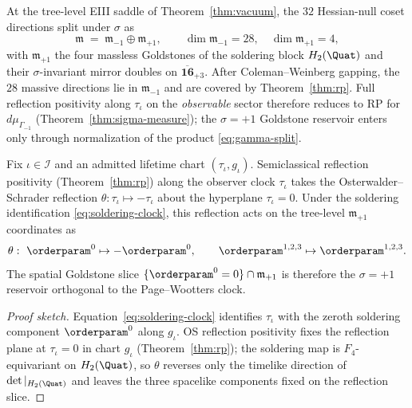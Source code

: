 \begin{lemma}
\label{lem:goldstone-sigma}
At the tree-level EIII saddle of Theorem~\ref{thm:vacuum}, the $32$
Hessian-null coset directions split under $\sigma$ as
\begin{equation}\label{eq:goldstone-split}
  \mathfrak{m}
  \;=\;
  \mathfrak{m}_{-1}\oplus\mathfrak{m}_{+1},
  \qquad
  \dim\mathfrak{m}_{-1}=28,\quad \dim\mathfrak{m}_{+1}=4,
\end{equation}
with $\mathfrak{m}_{+1}$ the four massless Goldstones of the soldering block
$H_2(\Quat)$ and their $\sigma$-invariant mirror doubles on
$\overline{\mathbf{16}}_{+3}$. After Coleman--Weinberg gapping, the
$28$ massive directions lie in $\mathfrak{m}_{-1}$ and are covered by
Theorem~\ref{thm:rp}. Full reflection positivity along $\tau_\iota$ on the
\emph{observable} sector therefore reduces to RP for $d\mu_{\Gamma_{-1}}$
(Theorem~\ref{thm:sigma-measure}); the $\sigma=+1$ Goldstone reservoir
enters only through normalization of the product \eqref{eq:gamma-split}.
\end{lemma}

\begin{proposition}
\label{prop:goldstone-rp-plane}
Fix $\iota\in\mathcal{I}$ and an admitted lifetime chart
$(\tau_\iota,g_\iota)$. Semiclassical reflection positivity (Theorem~\ref{thm:rp}) along the observer clock
$\tau_\iota$ takes the Osterwalder--Schrader reflection
$\theta:\tau_\iota\mapsto-\tau_\iota$ about the hyperplane $\tau_\iota=0$.
Under the soldering identification \eqref{eq:soldering-clock}, this
reflection acts on the tree-level $\mathfrak{m}_{+1}$ coordinates as
\begin{equation}\label{eq:goldstone-reflection}
  \theta:\ \orderparam^0\mapsto-\orderparam^0,
  \qquad
  \orderparam^{1,2,3}\mapsto\orderparam^{1,2,3}.
\end{equation}
The spatial Goldstone slice
$\{\orderparam^0=0\}\cap\mathfrak{m}_{+1}$ is therefore the
$\sigma=+1$ reservoir orthogonal to the Page--Wootters clock.
\end{proposition}

\begin{proof}[Proof sketch]
Equation~\eqref{eq:soldering-clock} identifies $\tau_\iota$ with the
zeroth soldering component $\orderparam^0$ along $g_\iota$. OS reflection
positivity fixes the reflection plane at $\tau_\iota=0$ in chart $g_\iota$
(Theorem~\ref{thm:rp}); the soldering map is $F_4$-equivariant on
$H_2(\Quat)$, so $\theta$ reverses only the timelike direction of
$\det|_{H_2(\Quat)}$ and leaves the three spacelike components fixed on the
reflection slice.
\end{proof}

